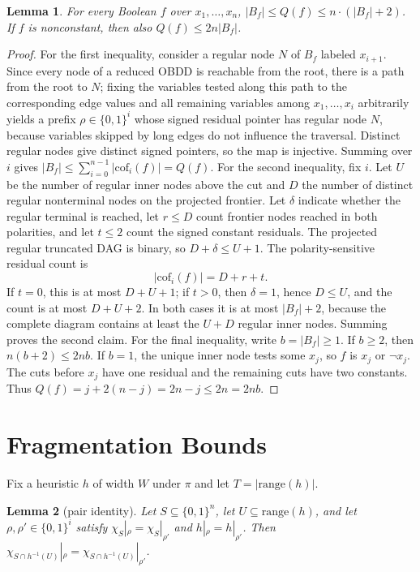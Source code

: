 \documentclass[letterpaper]{article}
\newcommand{\bdd}[1]{\ensuremath{B_{#1}}}
\newcommand{\bddsize}[1]{\ensuremath{|B_{#1}|}}
\newcommand{\cofcount}{\ensuremath{Q}}
\newcommand{\sub}[2]{\ensuremath{\mathrm{cof}_{#1}(#2)}}
\newcommand{\hrange}{\ensuremath{\mathrm{range}}}
\theoremstyle{plain}
\newtheorem{lemma}{Lemma}
\theoremstyle{definition}
\theoremstyle{remark}
\begin{document}
\begin{lemma}
\label{lem-qsize}
For every Boolean $f$ over $x_1, \dots, x_n$,
$\bddsize{f} \leq \cofcount(f) \leq n \cdot (\bddsize{f} + 2)$.
If $f$ is nonconstant, then also
$\cofcount(f)\leq2n\bddsize{f}$.
\end{lemma}

\begin{proof}
For the first inequality, consider a regular node $N$ of $\bdd{f}$ labeled
$x_{i+1}$. Since every node of a reduced OBDD is reachable from the root,
there is a path from the root to $N$; fixing the variables tested along
this path to the corresponding edge values and all remaining variables
among $x_1, \dots, x_i$ arbitrarily yields a prefix $\rho \in \{0,1\}^i$
whose signed residual pointer has regular node $N$, because variables skipped
by long edges do not influence the traversal. Distinct regular nodes give
distinct signed pointers, so the map is injective.
Summing over $i$ gives
$\bddsize{f} \leq \sum_{i=0}^{n-1} |\sub{i}{f}| = \cofcount(f)$. For the
second inequality, fix $i$. Let $U$ be the number of regular inner nodes
above the cut and $D$ the number of distinct regular nonterminal nodes on
the projected frontier. Let $\delta$ indicate whether the regular terminal
is reached, let $r\leq D$ count frontier nodes reached in both polarities,
and let $t\leq2$ count the signed constant residuals. The projected regular
truncated DAG is binary, so $D+\delta\leq U+1$. The polarity-sensitive
residual count is
\[
 |\sub{i}{f}|=D+r+t.
\]
If $t=0$, this is at most $D+U+1$; if $t>0$, then $\delta=1$, hence
$D\leq U$, and the count is at most $D+U+2$. In both cases it is at most
$\bddsize{f}+2$, because the complete diagram contains at least the $U+D$
regular inner nodes. Summing proves the second claim. For the final
inequality, write $b=\bddsize{f}\geq1$. If $b\geq2$, then
$n(b+2)\leq2nb$. If $b=1$, the unique inner node tests some $x_j$, so $f$
is $x_j$ or $\neg x_j$. The cuts before $x_j$ have one residual and the
remaining cuts have two constants. Thus
$\cofcount(f)=j+2(n-j)=2n-j\leq2n=2nb$.
\end{proof}

\section{Fragmentation Bounds}

Fix a heuristic $h$ of width $W$ under $\pi$ and let
$T=|\hrange(h)|$.

\begin{lemma}[pair identity]
\label{lem-pair}
Let $S\subseteq\{0,1\}^n$, let $U\subseteq\hrange(h)$, and let
$\rho,\rho'\in\{0,1\}^i$ satisfy
$\chi_S|_\rho=\chi_S|_{\rho'}$ and $h|_\rho=h|_{\rho'}$. Then
$\chi_{S\cap h^{-1}(U)}|_\rho=
\chi_{S\cap h^{-1}(U)}|_{\rho'}$.
\end{lemma}
\end{document}
